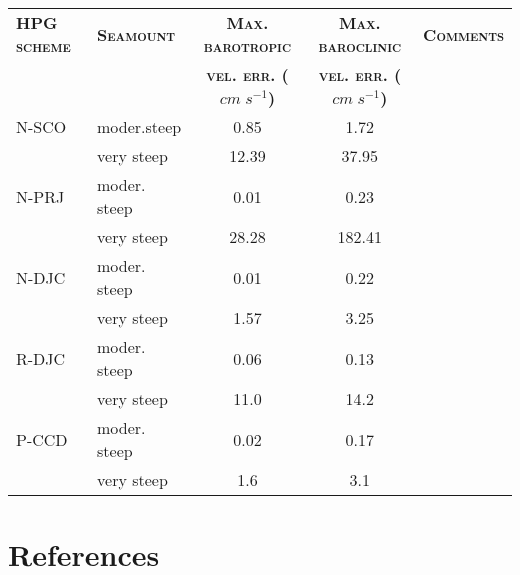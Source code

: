 \documentclass[authoryear]{elsarticle}
\begin{document}
\begin{table}[h]
	\centering
	\hspace{-7cm}
	\begin{scriptsize}
		\begin{tabular}{llccl}
			\cmidrule[0.5pt]{1-5}
			\textsc{\textbf{HPG scheme}} & \textsc{\textbf{Seamount}} & \textsc{\textbf{Max. barotropic}} & \textsc{\textbf{Max. baroclinic}} & \textsc{\textbf{Comments}}\\
			&  & \textsc{\textbf{vel. err. ($cm \; s^{-1}$)}} & \textsc{\textbf{vel. err. ($cm \; s^{-1}$)}} & \\ 
			\cmidrule[0.5pt]{1-5}
			N-SCO      & moder.steep  & 0.85  & 1.72  & \\
			           & very steep   & 12.39 & 37.95 & \\
			N-PRJ      & moder. steep & 0.01  & 0.23  & \\
			           & very steep   & 28.28 & 182.41 & \\
			N-DJC      & moder. steep & 0.01  & 0.22  & \\
			           & very steep   & 1.57  & 3.25  & \\
			R-DJC      & moder. steep & 0.06  & 0.13 & \cite{Ezer2002}\\
			           & very steep   & 11.0  & 14.2 & \cite{Ezer2002}\\
			P-CCD      & moder. steep & 0.02  & 0.17 & \cite{Ezer2002}\\
			           & very steep   & 1.6   & 3.1  & \cite{Ezer2002}\\   
			\cmidrule[.5pt]{1-5}
		\end{tabular}
	\end{scriptsize}
	\hspace{-7cm}
	\caption{ }
\end{table}

\newpage

\section*{References}


\end{document}
